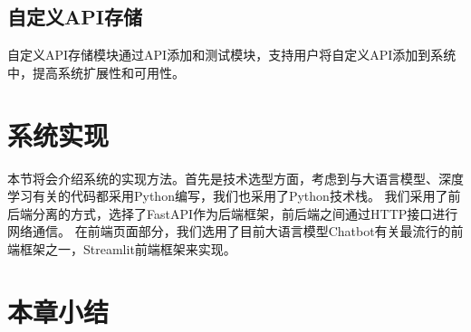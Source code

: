 \subsection{自定义API存储}
自定义API存储模块通过API添加和测试模块，支持用户将自定义API添加到系统中，提高系统扩展性和可用性。

\section{系统实现}

本节将会介绍系统的实现方法。首先是技术选型方面，考虑到与大语言模型、深度学习有关的代码都采用Python编写，我们也采用了Python技术栈。
我们采用了前后端分离的方式，选择了FastAPI作为后端框架，前后端之间通过HTTP接口进行网络通信。
在前端页面部分，我们选用了目前大语言模型Chatbot有关最流行的前端框架之一，Streamlit前端框架来实现。



\section{本章小结}